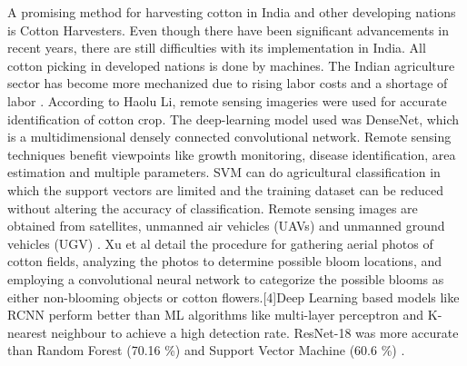 \documentclass[12pt,a4paper]{report}
\begin{document}
\par A promising method for harvesting cotton in India and other developing nations is Cotton Harvesters. Even though there have been significant advancements in recent years, there are still difficulties with its implementation in India. All cotton picking in developed nations is done by machines. The Indian agriculture sector has become more mechanized due to rising labor costs and a shortage of labor \cite{r1}. According to Haolu Li, remote sensing imageries were used for accurate identification of cotton crop. The deep-learning model used was DenseNet, which is a multidimensional densely connected convolutional network. Remote sensing techniques benefit viewpoints like growth monitoring, disease identification, area estimation and multiple parameters. SVM can do agricultural classification in which the support vectors are limited and the training dataset can be reduced without altering the accuracy of classification. Remote sensing images are obtained from satellites, unmanned air vehicles (UAVs) and unmanned ground vehicles (UGV) \cite{r2}. Xu et al detail the procedure for gathering aerial photos of cotton fields, analyzing the photos to determine possible bloom locations, and employing a convolutional neural network to categorize the possible blooms as either non-blooming objects or cotton flowers.[4]Deep Learning based models like RCNN perform better than ML algorithms like multi-layer perceptron and K-nearest neighbour to achieve a high detection rate. ResNet-18 was more accurate than Random Forest (70.16 \%) and Support Vector Machine (60.6 \%) \cite{r3}.
\end{document}
